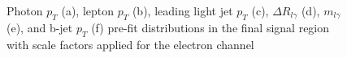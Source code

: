 \begin{figure}[]
\hfil  
{}
\caption{Photon $p_T$ (a), lepton $p_T$ (b), leading light jet $p_T$ (c), $\Delta R_{l\gamma}$ (d), $m_{l \gamma}$ (e), and b-jet $p_T$ (f) pre-fit distributions in the final signal region with scale factors applied for the electron channel }
\label{fig:SRej1}
\end{figure}


